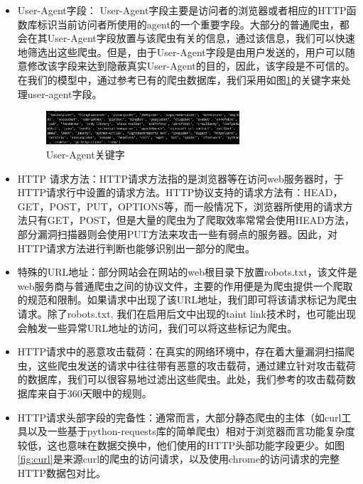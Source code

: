 \documentclass[doctor,privacy,twoside]{buaa_mac}
\begin{document}
\begin{itemize}
\item[1）] User-Agent字段： User-Agent字段主要是访问者的浏览器或者相应的HTTP函数库标识当前访问者所使用的agent的一个重要字段。大部分的普通爬虫，都会在其User-Agent字段放置与该爬虫有关的信息，通过该信息，我们可以快速地筛选出这些爬虫。但是，由于User-Agent字段是由用户发送的，用户可以随意修改该字段来达到隐蔽真实User-Agent的目的，因此，该字段是不可信的。在我们的模型中，通过参考已有的爬虫数据库，我们采用如图\ref{fig:ua}的关键字来处理user-agent字段。
    
\centerline{}
\begin{figure}[!h]
  \centering
  \includegraphics[width=0.68\textwidth]{images/crawler_key_words.png}
  \caption{User-Agent关键字}
  \label{fig:ua}
\end{figure}

    
\item[2）] HTTP 请求方法：HTTP请求方法指的是浏览器等在访问web服务器时，于HTTP请求行中设置的请求方法。HTTP协议支持的请求方法有：HEAD，GET，POST，PUT，OPTIONS等，而一般情况下，浏览器所使用的请求方法只有GET，POST，但是大量的爬虫为了爬取效率常常会使用HEAD方法，部分漏洞扫描器则会使用PUT方法来攻击一些有弱点的服务器。因此，对HTTP请求方法进行判断也能够识别出一部分的爬虫。

\item[3）] 特殊的URL地址：部分网站会在网站的web根目录下放置robots.txt，该文件是web服务商与普通爬虫之间的协议文件，主要的作用便是为爬虫提供一个爬取的规范和限制。如果请求中出现了该URL地址，我们即可将该请求标记为爬虫请求。除了robots.txt, 我们在启用后文中出现的taint link技术时，也可能出现会触发一些异常URL地址的访问，我们可以将这些标记为爬虫。

\item[4）] HTTP请求中的恶意攻击载荷：在真实的网络环境中，存在着大量漏洞扫描爬虫，这些爬虫发送的请求中往往带有恶意的攻击载荷，通过建立针对攻击载荷的数据库，我们可以很容易地过滤出这些爬虫。此处，我们参考的攻击载荷数据库来自于360天眼中的规则。

\item[5）] HTTP请求头部字段的完备性：通常而言，大部分静态爬虫的主体（如curl工具以及一些基于python-requests库的简单爬虫）相对于浏览器而言功能复杂度较低，这也意味在数据交换中，他们使用的HTTP头部功能字段更少。如图\ref{fig:curl}是来源curl的爬虫的访问请求，以及使用chrome的访问请求的完整HTTP数据包对比。
\end{itemize}
\end{document}
